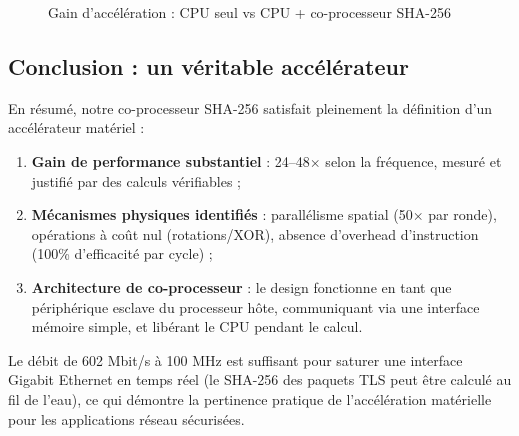 \begin{figure}[H]
\centering
{}
\caption{Gain d'accélération : CPU seul vs CPU + co-processeur SHA-256}
\label{fig:accel_gain}
\end{figure}

\subsection{Conclusion : un véritable accélérateur}

En résumé, notre co-processeur SHA-256 satisfait pleinement la définition d'un accélérateur matériel :

\begin{enumerate}
    \item \textbf{Gain de performance substantiel} : 24--48$\times$ selon la fréquence, mesuré et justifié par des calculs vérifiables ;
    \item \textbf{Mécanismes physiques identifiés} : parallélisme spatial (50$\times$ par ronde), opérations à coût nul (rotations/XOR), absence d'overhead d'instruction (100\% d'efficacité par cycle) ;
    \item \textbf{Architecture de co-processeur} : le design fonctionne en tant que périphérique esclave du processeur hôte, communiquant via une interface mémoire simple, et libérant le CPU pendant le calcul.
\end{enumerate}

Le débit de 602 Mbit/s à 100 MHz est suffisant pour saturer une interface Gigabit Ethernet en temps réel (le SHA-256 des paquets TLS peut être calculé au fil de l'eau), ce qui démontre la pertinence pratique de l'accélération matérielle pour les applications réseau sécurisées.

